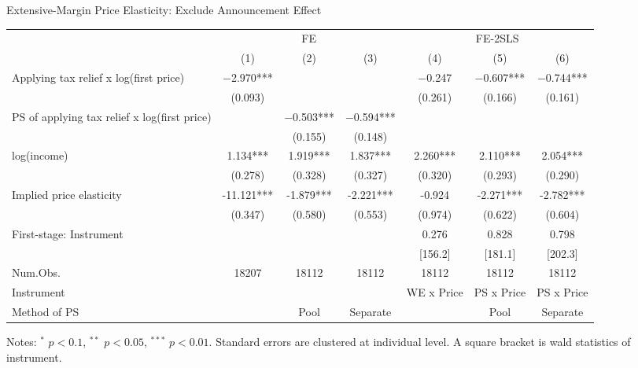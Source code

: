 \documentclass[
  ignorenonframetext,
  aspectratio=169,
]{beamer}
\begin{document}
\begin{frame}{Extensive-Margin Price Elasticity: Exclude Announcement Effect}
\protect\hypertarget{extensive-margin-price-elasticity-exclude-announcement-effect}{}
\begin{table}[!h]
\centering
\fontsize{8}{10}\selectfont
\begin{threeparttable}
\begin{tabular}[t]{>{\raggedright\arraybackslash}p{10em}cccccc}
\toprule
\multicolumn{1}{c}{ } & \multicolumn{3}{c}{FE} & \multicolumn{3}{c}{FE-2SLS} \\
\cmidrule(l{3pt}r{3pt}){2-4} \cmidrule(l{3pt}r{3pt}){5-7}
  & (1) & (2) & (3) & (4) & (5) & (6)\\
\midrule
Applying tax relief x log(first price) & \num{-2.970}*** &  &  & \num{-0.247} & \num{-0.607}*** & \num{-0.744}***\\
 & (\num{0.093}) &  &  & (\num{0.261}) & (\num{0.166}) & (\num{0.161})\\
PS of applying tax relief x log(first price) &  & \num{-0.503}*** & \num{-0.594}*** &  &  & \\
 &  & (\num{0.155}) & (\num{0.148}) &  &  & \\
log(income) & \num{1.134}*** & \num{1.919}*** & \num{1.837}*** & \num{2.260}*** & \num{2.110}*** & \num{2.054}***\\
 & (\num{0.278}) & (\num{0.328}) & (\num{0.327}) & (\num{0.320}) & (\num{0.293}) & (\num{0.290})\\
\midrule
Implied price elasticity & -11.121*** & -1.879*** & -2.221*** & -0.924 & -2.271*** & -2.782***\\
 & (0.347) & (0.580) & (0.553) & (0.974) & (0.622) & (0.604)\\
First-stage: Instrument &  &  &  & 0.276 & 0.828 & 0.798\\
 &  &  &  & {}[156.2] & {}[181.1] & {}[202.3]\\
Num.Obs. & \num{18207} & \num{18112} & \num{18112} & \num{18112} & \num{18112} & \num{18112}\\
Instrument &  &  &  & WE x Price & PS x Price & PS x Price\\
Method of PS &  & Pool & Separate &  & Pool & Separate\\
\bottomrule
\end{tabular}
\begin{tablenotes}
\item Notes: $^{*}$ $p < 0.1$, $^{**}$ $p < 0.05$, $^{***}$ $p < 0.01$. Standard errors are clustered at individual level. A square bracket is wald statistics of instrument.
\end{tablenotes}
\end{threeparttable}
\end{table}
\end{frame}
\end{document}
